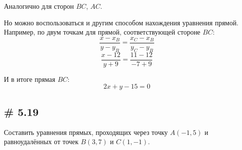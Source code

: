 \documentclass[a4paper,12pt]{article}
\begin{document}
\begin{solution}
    Аналогично для сторон $BC$, $AC$.
    
    Но можно воспользоваться и другим способом нахождения уравнения прямой.
    Например, по двум точкам для прямой, соответствующей стороне $BC$:
    \[
      \frac{x - x_B}{y - y_B} = \frac{x_C - x_B}{y_C - y_B}
    \]
    \[
      \frac{x - 12}{y + 9} = \frac{11 - 12}{-7 + 9}
    \]
    
    И в итоге прямая $BC$:
    \[
      2x + y - 15 = 0
    \]
  \end{solution}
  
  
  \subsection{\# 5.19}
  
  \begin{problem}
    Составить уравнения прямых, проходящих через точку $A(-1, 5)$ и равноудалённых от точек $B(3, 7)$ и $C(1, -1)$.
  \end{problem}
  
\end{document}
